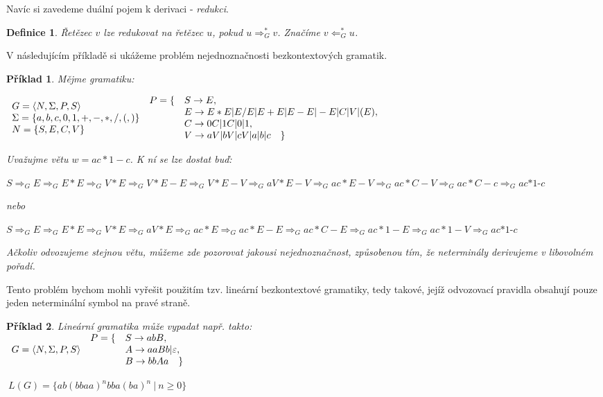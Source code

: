 \documentclass[10pt,a4paper]{article}
\theoremstyle{note}
\newtheorem{definice}{Definice}
\newtheorem{priklad}{Příklad}
\begin{document}
Navíc si zavedeme duální pojem k derivaci - \textit{redukci}.
\begin{definice}
Řetězec $v$ lze redukovat na řetězec $u$, pokud $u \Rightarrow_G^* v$. Značíme
$v \Leftarrow_G^* u$. 
\end{definice}
V následujícím příkladě si ukážeme problém nejednoznačnosti bezkontextových gramatik.
\begin{priklad}\label{priklad-6}
Mějme gramatiku:

$\begin{array}{l}
G=\langle N,\Sigma,P,S \rangle \\
\Sigma = \lbrace a,b,c,0,1,+,-,*,/,(,) \rbrace \\
N = \lbrace S,E,C,V \rbrace \\
\end{array}\\
\begin{array}{l l}
P= \lbrace &S \rightarrow E, \\
& E \rightarrow E*E|E/E|E+E|E-E|-E|C|V|(E), \\
& C \rightarrow 0C|1C|0|1, \\
& V \rightarrow aV|bV|cV|a|b|c \quad \rbrace
\end{array}
$

Uvažujme větu $w=ac*1-c$. K ní se lze dostat buď:

$
S \Rightarrow_G E \Rightarrow_G E*E \Rightarrow_G V*E \Rightarrow_G V*E-E \Rightarrow_G V*E-V \Rightarrow_G aV*E-V \Rightarrow_G ac*E-V \Rightarrow_G ac*C-V \Rightarrow_G ac*C-c \Rightarrow_G \textit{ac*1-c}
$

nebo

$
S \Rightarrow_G E \Rightarrow_G E*E \Rightarrow_G V*E \Rightarrow_G aV*E \Rightarrow_G ac*E \Rightarrow_G ac*E-E \Rightarrow_G ac*C-E \Rightarrow_G ac*1-E \Rightarrow_G ac*1-V \Rightarrow_G \textit{ac*1-c}
$

Ačkoliv odvozujeme stejnou větu, můžeme zde pozorovat jakousi nejednoznačnost, způsobenou tím, že neterminály derivujeme v libovolném pořadí.
\end{priklad}
Tento problém bychom mohli vyřešit použitím tzv. lineární bezkontextové gramatiky, tedy takové, jejíž odvozovací pravidla obsahují pouze jeden neterminální symbol na pravé straně.
\begin{priklad}Lineární gramatika může vypadat např. takto: \\
$\begin{array}{l}
G=\langle N,\Sigma,P,S \rangle \\
\end{array}\\
\begin{array}{l l}
P= \lbrace &S \rightarrow abB, \\
& A \rightarrow aaBb|\varepsilon, \\
& B \rightarrow bbAa \quad \rbrace
\end{array}
$

$\ L(G) = \lbrace ab(bbaa)^nbba(ba)^n\ |\ n \ge0 \rbrace$
\end{priklad}
\end{document}
